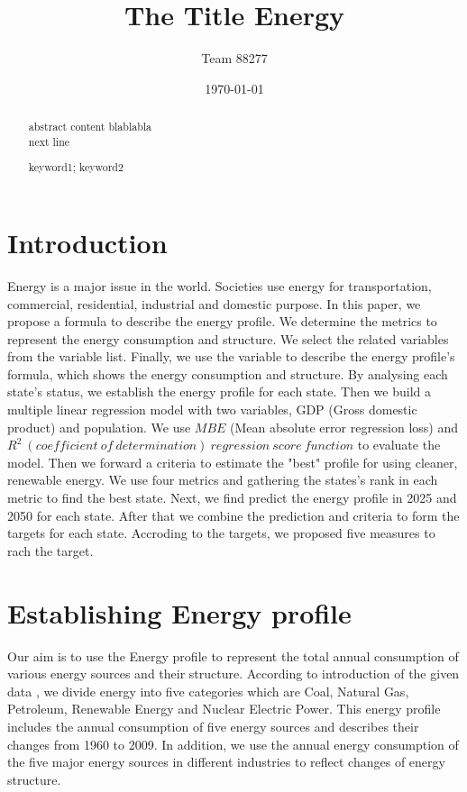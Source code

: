 \documentclass{mcmthesis}
\title{The Title Energy}
\author{Team 88277}
\date{\today}
\begin{document}
\begin{abstract}
abstract content blablabla \\
next line
\begin{keywords}
keyword1; keyword2
\end{keywords}

\end{abstract}

\maketitle                  %
\tableofcontents
\section{Introduction}
Energy is a major issue in the world. Societies use energy for transportation, commercial, residential, industrial and domestic purpose.
In this paper, we propose a formula to describe the energy profile. We determine the metrics to represent the energy consumption and structure.
We select the related variables from the variable list.
Finally, we use the variable to describe the energy profile's formula, which shows the energy consumption and structure.
By analysing each state's status, we establish the energy profile for each state.
Then we build a multiple linear regression model with two variables, GDP (Gross domestic product) and population.
We use $MBE$ (Mean absolute error regression loss) and $R^2\ (coefficient\ of\ determination)\ regression\ score\ function$ to evaluate the model.
Then we forward a criteria to estimate the "best" profile for using cleaner, renewable energy.
We use four metrics and gathering the states's rank in each metric to find the best state.
Next, we find predict the energy profile in 2025 and 2050 for each state. After that we combine the prediction and criteria to form the targets for each state.
Accroding to the targets, we proposed five measures to rach the target.
\section{Establishing Energy profile}
Our aim is to use the Energy profile to represent the total annual consumption of various energy
sources and their structure. According to introduction of the given data \cite{1},
we divide energy into five categories which are Coal, Natural Gas, Petroleum, Renewable Energy and Nuclear Electric Power.
This energy profile includes the annual consumption of five energy sources and describes their changes from 1960 to 2009.
In addition, we use the annual energy consumption of the five major energy sources
in different industries to reflect changes of energy structure.
\end{document}
